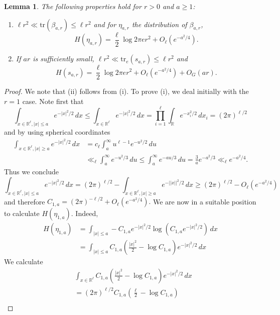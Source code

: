 \documentclass[10pt, english,oneside,reqno]{amsart}
\theoremstyle{plain}
\newtheorem{lemma}[theorem]{Lemma}
\theoremstyle{remark}
\numberwithin{equation}{section}
\numberwithin{figure}{section}
\newcommand{\tr}{\mathrm{tr}}
\newcommand{\R}{\mathbb{R}}
\begin{document}
\begin{lemma}\label{VarEntProperties}
    The following properties hold for $r > 0$ and $a\geq 1$:
    \begin{enumerate}[label = (\roman*)]
        \item $\ell r^2 \ll \tr(\beta_{a,r}) \leq \ell r^2$ and for $\eta_{a,r}$ the distribution of $\beta_{a,r}$, $$H(\eta_{a,r}) = \frac{\ell}{2}  \log 2\pi e r^2 + O_{\ell}(e^{-a^2/4}).$$
        \item If $ar$ is sufficiently small,  $\ell r^2 \ll \tr_e(s_{a,r}) \leq \ell r^2$ and 
        $$H(s_{a,r}) = \frac{\ell}{2}  \log 2\pi e r^2 + O_{\ell}(e^{-a^2/4}) + O_{G}(ar).$$
    \end{enumerate}
\end{lemma}

\begin{proof}
    We note that (ii) follows from (i). To prove (i), we deal initially with the $r = 1$ case. Note first that $$\int_{x \in \R^{\ell}, |x| \leq a} e^{-|x|^2/2} \, dx \leq \int_{x \in \R^{\ell}} e^{-|x|^2/2} \, dx = \prod_{i = 1}^\ell \int_{\R} e^{-x_i^2/2 } \, dx_i = (2\pi)^{\ell/2}$$ and by using spherical coordinates 
    \begin{align*}
        \int_{x \in \R^{\ell}, |x| \geq a} e^{-|x|^2/2} \, dx &= c_{\ell} \int_{a}^{\infty} u^{\ell - 1} e^{-u^2/2} \, du \\ &\ll_{\ell} \int_{a}^{\infty}  e^{-u^2/3} \, du \leq \int_a^{\infty} e^{-au/3} \, du = \frac{3}{a}e^{-a^2/3} \ll_{\ell} e^{-a^2/4}.
    \end{align*} Thus we conclude $$\int_{x \in \R^{\ell}, |x| \leq a} e^{-|x|^2/2} \, dx  = (2\pi)^{\ell/2} - \int_{x \in \R^{\ell}, |x| \geq a} e^{-||x||^2/2} \, dx \geq (2\pi)^{\ell/2} - O_{\ell}(e^{-a^2/4})$$ and therefore $C_{1,a} = (2\pi)^{-\ell/2} + O_{\ell}(e^{-a^2/4}).$ We are now in a suitable position to calculate $H(\eta_{1,a})$. Indeed, 
    \begin{align*}
        H(\eta_{1,a}) &= \int_{|x| \leq a} -C_{1,a} e^{-|x|^2/2} \log\left(C_{1,a} e^{-|x|^2/2} \right) \, dx \\ &= \int_{|x| \leq a} C_{1,a}\left(  \frac{|x|^2}{2} - \log C_{1,a} \right) e^{-|x|^2/2}  \, dx 
    \end{align*} 
    We calculate 
    \begin{align*}
    &\int_{x\in \R^{\ell}} C_{1,a}\left(  \frac{|x|^2}{2} - \log C_{1,a} \right) e^{-|x|^2/2}  \, dx \\ &= (2\pi)^{\ell/2} C_{1,a}\left( \frac{\ell}{2} - \log C_{1,a} \right) \\

\end{align*}
\end{proof}
\end{document}
